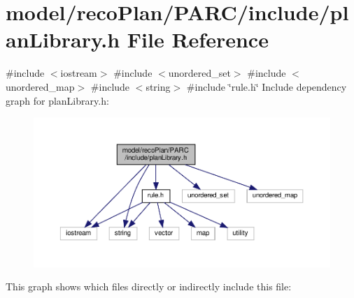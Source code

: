 \section{model/reco\+Plan/\+P\+A\+R\+C/include/plan\+Library.h File Reference}
\label{plan_library_8h}
{\ttfamily \#include $<$iostream$>$}\newline
{\ttfamily \#include $<$unordered\+\_\+set$>$}\newline
{\ttfamily \#include $<$unordered\+\_\+map$>$}\newline
{\ttfamily \#include $<$string$>$}\newline
{\ttfamily \#include \char`\"{}rule.\+h\char`\"{}}\newline
Include dependency graph for plan\+Library.\+h\+:
\nopagebreak
\begin{figure}[H]
\begin{center}
\leavevmode
\includegraphics[width=350pt]{plan_library_8h__incl}
\end{center}
\end{figure}
This graph shows which files directly or indirectly include this file\+:
\nopagebreak
